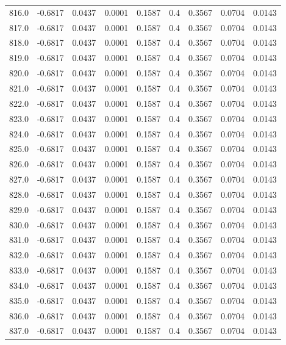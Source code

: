 \begin{longtable}{lrrrrrrrr}
816.0 & -0.6817 & 0.0437 & 0.0001 & 0.1587 & 0.4 & 0.3567 & 0.0704 & 0.0143 \\
817.0 & -0.6817 & 0.0437 & 0.0001 & 0.1587 & 0.4 & 0.3567 & 0.0704 & 0.0143 \\
818.0 & -0.6817 & 0.0437 & 0.0001 & 0.1587 & 0.4 & 0.3567 & 0.0704 & 0.0143 \\
819.0 & -0.6817 & 0.0437 & 0.0001 & 0.1587 & 0.4 & 0.3567 & 0.0704 & 0.0143 \\
820.0 & -0.6817 & 0.0437 & 0.0001 & 0.1587 & 0.4 & 0.3567 & 0.0704 & 0.0143 \\
821.0 & -0.6817 & 0.0437 & 0.0001 & 0.1587 & 0.4 & 0.3567 & 0.0704 & 0.0143 \\
822.0 & -0.6817 & 0.0437 & 0.0001 & 0.1587 & 0.4 & 0.3567 & 0.0704 & 0.0143 \\
823.0 & -0.6817 & 0.0437 & 0.0001 & 0.1587 & 0.4 & 0.3567 & 0.0704 & 0.0143 \\
824.0 & -0.6817 & 0.0437 & 0.0001 & 0.1587 & 0.4 & 0.3567 & 0.0704 & 0.0143 \\
825.0 & -0.6817 & 0.0437 & 0.0001 & 0.1587 & 0.4 & 0.3567 & 0.0704 & 0.0143 \\
826.0 & -0.6817 & 0.0437 & 0.0001 & 0.1587 & 0.4 & 0.3567 & 0.0704 & 0.0143 \\
827.0 & -0.6817 & 0.0437 & 0.0001 & 0.1587 & 0.4 & 0.3567 & 0.0704 & 0.0143 \\
828.0 & -0.6817 & 0.0437 & 0.0001 & 0.1587 & 0.4 & 0.3567 & 0.0704 & 0.0143 \\
829.0 & -0.6817 & 0.0437 & 0.0001 & 0.1587 & 0.4 & 0.3567 & 0.0704 & 0.0143 \\
830.0 & -0.6817 & 0.0437 & 0.0001 & 0.1587 & 0.4 & 0.3567 & 0.0704 & 0.0143 \\
831.0 & -0.6817 & 0.0437 & 0.0001 & 0.1587 & 0.4 & 0.3567 & 0.0704 & 0.0143 \\
832.0 & -0.6817 & 0.0437 & 0.0001 & 0.1587 & 0.4 & 0.3567 & 0.0704 & 0.0143 \\
833.0 & -0.6817 & 0.0437 & 0.0001 & 0.1587 & 0.4 & 0.3567 & 0.0704 & 0.0143 \\
834.0 & -0.6817 & 0.0437 & 0.0001 & 0.1587 & 0.4 & 0.3567 & 0.0704 & 0.0143 \\
835.0 & -0.6817 & 0.0437 & 0.0001 & 0.1587 & 0.4 & 0.3567 & 0.0704 & 0.0143 \\
836.0 & -0.6817 & 0.0437 & 0.0001 & 0.1587 & 0.4 & 0.3567 & 0.0704 & 0.0143 \\
837.0 & -0.6817 & 0.0437 & 0.0001 & 0.1587 & 0.4 & 0.3567 & 0.0704 & 0.0143 \\

\end{longtable}
